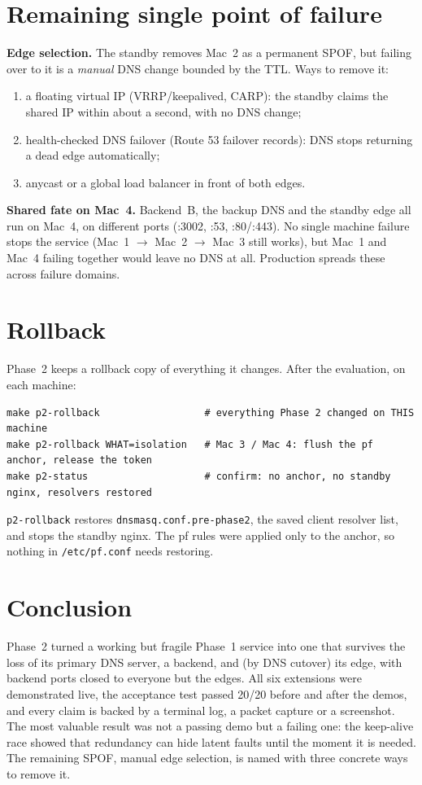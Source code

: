 \documentclass[11pt,a4paper]{article}
\begin{document}
\section{Remaining single point of failure}
\textbf{Edge selection.} The standby removes Mac~2 as a permanent SPOF, but failing over to it is a
\emph{manual} DNS change bounded by the TTL. Ways to remove it:
\begin{enumerate}
  \item a floating virtual IP (VRRP/keepalived, CARP): the standby claims the shared IP within about a second, with no DNS change;
  \item health-checked DNS failover (Route 53 failover records): DNS stops returning a dead edge automatically;
  \item anycast or a global load balancer in front of both edges.
\end{enumerate}

\textbf{Shared fate on Mac~4.} Backend~B, the backup DNS and the standby edge all run on Mac~4, on
different ports (:3002, :53, :80/:443). No single machine failure stops the service
(Mac~1 $\to$ Mac~2 $\to$ Mac~3 still works), but Mac~1 and Mac~4 failing together would leave no DNS
at all. Production spreads these across failure domains.

\section{Rollback}
Phase~2 keeps a rollback copy of everything it changes. After the evaluation, on each machine:
\begin{lstlisting}
make p2-rollback                  # everything Phase 2 changed on THIS machine
make p2-rollback WHAT=isolation   # Mac 3 / Mac 4: flush the pf anchor, release the token
make p2-status                    # confirm: no anchor, no standby nginx, resolvers restored
\end{lstlisting}
\texttt{p2-rollback} restores \texttt{dnsmasq.conf.pre-phase2}, the saved client resolver list, and
stops the standby nginx. The pf rules were applied only to the anchor, so nothing in
\texttt{/etc/pf.conf} needs restoring.

\section{Conclusion}
Phase~2 turned a working but fragile Phase~1 service into one that survives the loss of its primary
DNS server, a backend, and (by DNS cutover) its edge, with backend ports closed to everyone but the
edges. All six extensions were demonstrated live, the acceptance test passed 20/20 before and after
the demos, and every claim is backed by a terminal log, a packet capture or a screenshot. The most
valuable result was not a passing demo but a failing one: the keep-alive race showed that
redundancy can hide latent faults until the moment it is needed. The remaining SPOF, manual edge
selection, is named with three concrete ways to remove it.
\end{document}
